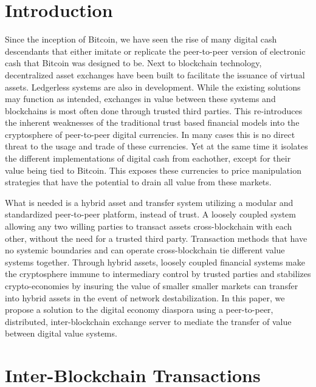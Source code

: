 \documentclass[a4paper]{article}
\begin{document}
\section{Introduction}
Since the inception of Bitcoin, we have seen the rise of many digital cash descendants that either imitate or replicate the peer-to-peer version of electronic cash that Bitcoin was designed to be. Next to blockchain technology, decentralized asset exchanges\cite{counterparty} have been built to facilitate the issuance of virtual assets. Ledgerless \cite{opentransactions} systems are also in development. While the existing solutions may function as intended, exchanges in value between these systems and blockchains is most often done through trusted third parties. This re-introduces the inherent weaknesses of the traditional trust based financial models into the cryptosphere of peer-to-peer digital currencies. In many cases this is no direct threat to the usage and trade of these currencies. Yet at the same time it isolates the different implementations of digital cash from eachother, except for their value being tied to Bitcoin. This exposes these currencies to price manipulation strategies that have the potential to drain all value from these markets. \cite{panture}

What is needed is a hybrid asset and transfer system utilizing a modular and standardized peer-to-peer platform, instead of trust. A loosely coupled system\cite{EDA} allowing any two willing parties to transact assets cross-blockchain with each other, without the need for a trusted third party. Transaction methods that have no systemic boundaries and can operate cross-blockchain tie different value systems together. Through hybrid assets, loosely coupled financial systems make the cryptosphere immune to intermediary control by trusted parties and stabilizes crypto-economies by insuring the value of smaller smaller markets can transfer into hybrid assets in the event of network destabilization. In this paper, we propose a solution to the digital economy diaspora using a peer-to-peer, distributed, inter-blockchain exchange server to mediate the transfer of value between digital value systems.

\section{Inter-Blockchain Transactions}
\end{document}
